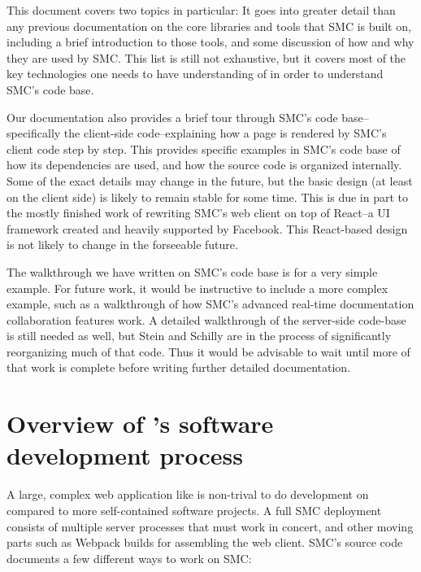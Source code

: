 \documentclass{deliverablereport}
\begin{document}
This document covers two topics in particular: It goes into greater detail than
any previous documentation on the core \JavaScript libraries and tools that SMC
is built on, including a brief introduction to those tools, and some discussion
of how and why they are used by SMC.  This list is still not exhaustive, but it
covers most of the key technologies one needs to have understanding of in order
to understand SMC's code base.

Our documentation also provides a brief tour through SMC's code base--
specifically the client-side code--explaining how a page is rendered by SMC's
client code step by step.  This provides specific examples in SMC's code base
of how its dependencies are used, and how the source code is organized
internally.  Some of the exact details may change in the future, but the basic
design (at least on the client side) is likely to remain stable for some time.
This is due in part to the mostly finished work of rewriting SMC's web client
on top of React--a \JavaScript UI framework created and heavily supported by
Facebook.  This React-based design is not likely to change in the forseeable
future.

The walkthrough we have written on SMC's code base is for a very simple
example.  For future work, it would be instructive to include a more complex
example, such as a walkthrough of how SMC's advanced real-time documentation
collaboration features work.  A detailed walkthrough of the server-side
code-base is still needed as well, but Stein and Schilly are in the process of
significantly reorganizing much of that code. Thus it would be advisable to
wait until more of that work is complete before writing further detailed
documentation.


\section{Overview of \SMC's software development process}
A large, complex web application like \SMC is non-trival to do development
on compared to more self-contained software projects.  A full SMC deployment
consists of multiple server processes that must work in concert, and other
moving parts such as Webpack builds for assembling the web client.  SMC's
source code documents a few different ways to work on SMC:
\end{document}
